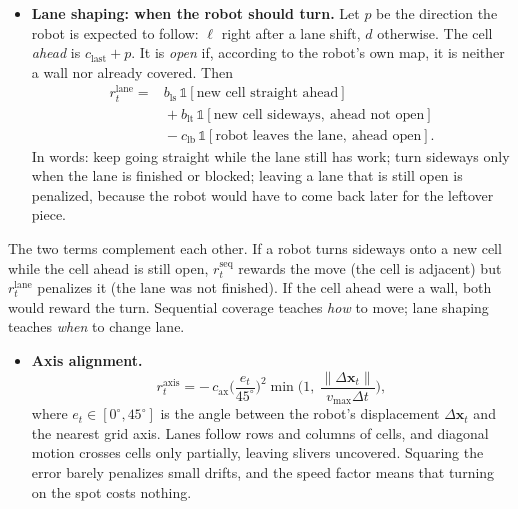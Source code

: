 \documentclass[11pt,a4paper]{article}
\begin{document}
\begin{enumerate}[label=\textbf{\arabic*.},resume]
\begin{itemize}
 \item \textbf{Lane shaping: when the robot should turn.}
 Let $p$ be the direction the robot is expected to follow: $\ell$ right
 after a lane shift, $d$ otherwise. The cell \emph{ahead} is
 $c_{\text{last}} + p$. It is \emph{open} if, according to the robot's own
 map, it is neither a wall nor already covered. Then
 \begin{align*}
    r^{\mathrm{lane}}_t ={} & b_{\mathrm{ls}}\,\mathbb{1}[\text{new cell straight ahead}] \\
    & {}+ b_{\mathrm{lt}}\,\mathbb{1}[\text{new cell sideways},\ \text{ahead not open}] \\
    & {}- c_{\mathrm{lb}}\,\mathbb{1}[\text{robot leaves the lane},\ \text{ahead open}].
 \end{align*}
 In words: keep going straight while the lane still has work; turn sideways
 only when the lane is finished or blocked; leaving a lane that is still open
 is penalized, because the robot would have to come back later for the
 leftover piece.
\end{itemize}
The two terms complement each other. If a robot turns sideways onto a new
cell while the cell ahead is still open, $r^{\mathrm{seq}}_t$ rewards the
move (the cell is adjacent) but $r^{\mathrm{lane}}_t$ penalizes it (the lane
was not finished). If the cell ahead were a wall, both would reward the turn.
Sequential coverage teaches \emph{how} to move; lane shaping teaches
\emph{when} to change lane.

\begin{itemize}
 \item \textbf{Axis alignment.}
 \[
   r^{\mathrm{axis}}_t = -\,c_{\mathrm{ax}}
   \Big(\frac{e_t}{45^\circ}\Big)^{2}
   \min\!\Big(1,\ \frac{\|\Delta \mathbf{x}_t\|}{v_{\max}\Delta t}\Big),
 \]
 where $e_t\in[0^\circ,45^\circ]$ is the angle between the robot's
 displacement $\Delta\mathbf{x}_t$ and the nearest grid axis. Lanes follow
 rows and columns of cells, and diagonal motion crosses cells only partially,
 leaving slivers uncovered. Squaring the error barely penalizes small
 drifts, and the speed factor means that turning on the spot costs nothing.
\end{itemize}


\end{enumerate}
\end{document}
